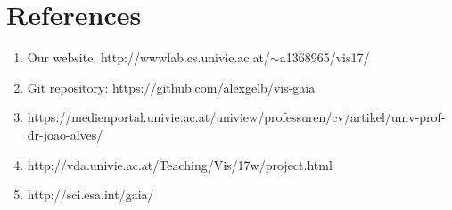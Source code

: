 \documentclass{article}
\begin{document}
\section {References}
\begin{enumerate}
\item Our website: http://wwwlab.cs.univie.ac.at/$\sim$a1368965/vis17/
\item Git repository: https://github.com/alexgelb/vis-gaia
\item https://medienportal.univie.ac.at/uniview/professuren/cv/artikel/univ-prof-dr-joao-alves/
\item http://vda.univie.ac.at/Teaching/Vis/17w/project.html
\item http://sci.esa.int/gaia/
\end{enumerate}
\end{document}
